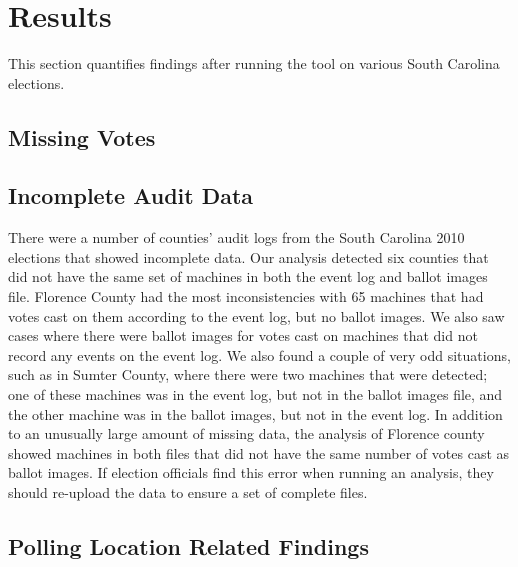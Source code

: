 \section{Results}
This section quantifies findings after running the tool on various South Carolina elections.

\subsection{Missing Votes}

\subsection{Incomplete Audit Data}
There were a number of counties' audit logs from the South Carolina 2010 elections that showed incomplete data.  Our analysis detected six counties that did not have the same set of machines in both the event log and ballot images file.  Florence County had the most inconsistencies with 65 machines that had votes cast on them according to the event log, but no ballot images.  We also saw cases where there were ballot images for votes cast on machines that did not record any events on the event log.  We also found a couple of very odd situations, such as in Sumter County, where there were two machines that were detected; one of these machines was in the event log, but not in the ballot images file, and the other machine was in the ballot images, but not in the event log.  In addition to an unusually large amount of missing data, the analysis of Florence county showed machines in both files that did not have the same number of votes cast as ballot images.  If election officials find this error when running an analysis,  they should re-upload the data to ensure a set of complete files.

\subsection{Polling Location Related Findings}

